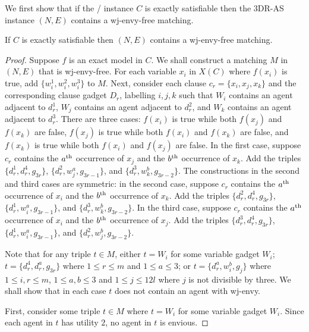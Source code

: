 We first show that if the \porschenxsatvariant/ instance $C$ is exactly satisfiable then the 3DR-AS instance $(N, E)$ contains a wj-envy-free matching.

\begin{lem}
\label{lem:threed_efr_as_wjenvy_firstdirection}
If $C$ is exactly satisfiable then $(N, E)$ contains a wj-envy-free matching.
\end{lem}
\begin{proof}
Suppose $f$ is an exact model in $C$. We shall construct a matching $M$ in $(N, E)$ that is wj-envy-free. For each variable $x_i$ in $X(C)$ where $f(x_i)$ is true, add $\{ w_i^1, w_i^2, w_i^3 \}$ to $M$. Next, consider each clause $c_r = \{ x_i, x_j, x_k \}$ and the corresponding clause gadget $D_r$, labelling $i, j, k$ such that $W_i$ contains an agent adjacent to $d_r^1$, $W_j$ contains an agent adjacent to $d_r^2$, and $W_k$ contains an agent adjacent to $d_r^3$. There are three cases: $f(x_i)$ is true while both $f(x_j)$ and $f(x_k)$ are false, $f(x_j)$ is true while both $f(x_i)$ and $f(x_k)$ are false, and $f(x_k)$ is true while both $f(x_i)$ and $f(x_j)$ are false. In the first case, suppose $c_r$ contains the $a\textsuperscript{th}$ occurrence of $x_j$ and the $b\textsuperscript{th}$ occurrence of $x_k$. Add the triples $\{ d_r^1, d_r^4, g_{3r} \}$, $\{ d_r^2, w_j^a, g_{3r-1} \}$, and $\{ d_r^3, w_k^b, g_{3r-2} \}$. The constructions in the second and third cases are symmetric: in the second case, suppose $c_r$ contains the $a\textsuperscript{th}$ occurrence of $x_i$ and the $b\textsuperscript{th}$ occurrence of $x_k$. Add the triples $\{ d_r^2, d_r^4, g_{3r} \}$, $\{ d_r^1, w_i^a, g_{3r-1} \}$, and $\{ d_r^3, w_k^b, g_{3r-2} \}$. In the third case, suppose $c_r$ contains the $a\textsuperscript{th}$ occurrence of $x_i$ and the $b\textsuperscript{th}$ occurrence of $x_j$. Add the triples $\{ d_r^3, d_r^4, g_{3r} \}$, $\{ d_r^1, w_i^a, g_{3r-1} \}$, and $\{ d_r^2, w_j^b, g_{3r-2} \}$. 

Note that for any triple $t\in M$, either $t=W_i$ for some variable gadget $W_i$; $t=\{ d_r^4, d_r^a, g_{3r} \}$ where $1\leq r\leq m$ and $1\leq a \leq 3$; or $t=\{ d_r^a, w_i^b, g_j \}$ where $1\leq i, r \leq m$, $1\leq a, b \leq 3$ and $1\leq j\leq 12l$ where $j$ is not divisible by three. We shall show that in each case $t$ does not contain an agent with wj-envy.

First, consider some triple $t\in M$ where $t=W_i$ for some variable gadget $W_i$. Since each agent in $t$ has utility $2$, no agent in $t$ is envious.


\end{proof}
